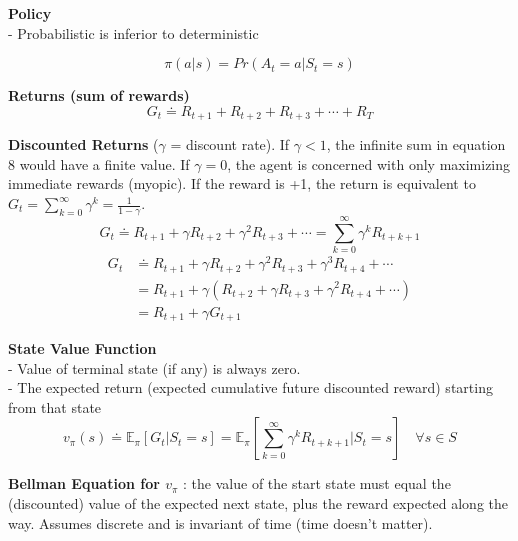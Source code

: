 \documentclass{article}
\begin{document}
\noindent
\textbf{Policy }
\\
- Probabilistic is inferior to deterministic

\begin{equation}
\pi(a | s)= Pr(A_{t} = a | S_{t}=s)
\end{equation}

\noindent
\textbf{Returns (sum of rewards) }
\begin{equation}
G_{t} \doteq R_{t+1}+R_{t+2}+R_{t+3}+\cdots+R_{T}
\end{equation}

\noindent
\textbf{Discounted Returns }
($\gamma$ = discount rate). If $\gamma < 1$, the infinite sum
in equation 8 would have a finite value. If $\gamma = 0$, the agent is concerned
with only maximizing immediate rewards (myopic). If the reward is +1, the return
is equivalent to $G_{t}=\sum_{k=0}^{\infty} \gamma^{k}=\frac{1}{1-\gamma}$.
\begin{equation}
G_{t} \doteq R_{t+1}+\gamma R_{t+2}+\gamma^{2} R_{t+3}+\cdots=\sum_{k=0}^{\infty} \gamma^{k} R_{t+k+1}
\end{equation}
\begin{equation}
\begin{aligned}
G_{t} & \doteq R_{t+1}+\gamma R_{t+2}+\gamma^{2} R_{t+3}+\gamma^{3} R_{t+4}+\cdots \\
&=R_{t+1}+\gamma\left(R_{t+2}+\gamma R_{t+3}+\gamma^{2} R_{t+4}+\cdots\right) \\
&=R_{t+1}+\gamma G_{t+1}
\end{aligned}
\end{equation}

\noindent
\textbf{State Value Function}\\
- Value of terminal state (if any) is always zero.\\
- The expected return (expected cumulative future discounted reward) starting
from that state\\

\begin{equation}
v_{\pi}(s) \doteq \mathbb{E}_{\pi}[G_{t} | S_{t}=s]=\mathbb{E}_{\pi}[\sum_{k=0}^{\infty} \gamma^{k} R_{t+k+1} | S_{t}=s] \quad \forall s \in S
\end{equation}

\newpage
\noindent
\textbf{Bellman Equation for $v_{\pi}$}
: the value of the start state must equal the
(discounted) value of the expected next state, plus the reward expected along
the way. Assumes discrete and is invariant of time (time doesn't matter).
\end{document}
